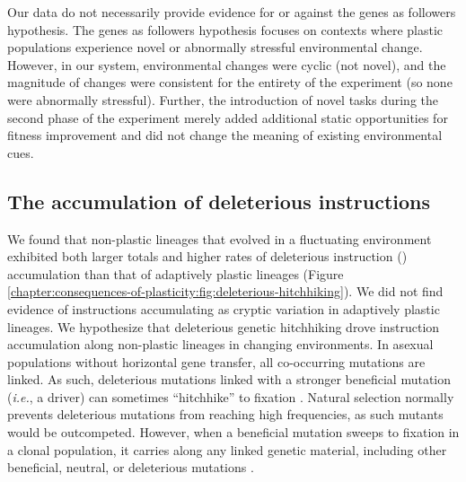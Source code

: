 Our data do not necessarily provide evidence for or against the genes as followers hypothesis.
The genes as followers hypothesis focuses on contexts where plastic populations experience novel or abnormally stressful environmental change.
However, in our system, environmental changes were cyclic (not novel), and the magnitude of changes were consistent for the entirety of the experiment (so none were abnormally stressful).
Further, the introduction of novel tasks during the second phase of the experiment merely added additional static opportunities for fitness improvement and did not change the meaning of existing environmental cues. 

\subsection{The accumulation of deleterious instructions}

We found that non-plastic lineages that evolved in a fluctuating environment exhibited both larger totals and higher rates of deleterious instruction () accumulation than that of adaptively plastic lineages (Figure \ref{chapter:consequences-of-plasticity:fig:deleterious-hitchhiking}).
We did not find evidence of  instructions accumulating as cryptic variation in adaptively plastic lineages.
We hypothesize that deleterious genetic hitchhiking drove  instruction accumulation along non-plastic lineages in changing environments.
In asexual populations without horizontal gene transfer, all co-occurring mutations are linked.
As such, deleterious mutations linked with a stronger beneficial mutation (\textit{i.e.}, a driver) can sometimes ``hitchhike'' to fixation \citep{smith_hitch-hiking_1974,van_den_bergh_experimental_2018,buskirk_hitchhiking_2017}.
Natural selection normally prevents deleterious mutations from reaching high frequencies, as such mutants would be outcompeted.
However, when a beneficial mutation sweeps to fixation in a clonal population, it carries along any linked genetic material, including other beneficial, neutral, or deleterious mutations  \cite{barton_genetic_2000,smith_hitch-hiking_1974}.

